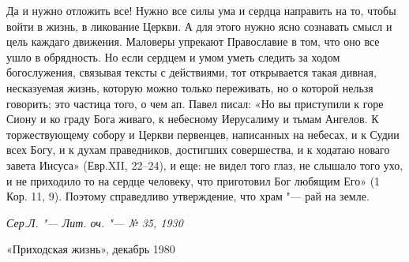 \begin{mymulticols}
Да и нужно отложить все! Нужно все силы ума и сердца направить на то, чтобы войти в жизнь, в ликование Церкви. А для этого нужно ясно сознавать смысл и цель каждаго движения. Маловеры упрекают Православие в том, что оно все ушло в обрядность. Но если сердцем и умом уметь следить за ходом богослужения, связывая тексты с действиями, тот открывается такая дивная, несказуемая жизнь, которую можно только переживать, но о которой нельзя говорить; это частица того, о чем ап. Павел писал: «Но вы приступили к горе Сиону и ко граду Бога живаго, к небесному Иерусалиму и тьмам Ангелов. К торжествующему собору и Церкви первенцев, написанных на небесах, и к Судии всех Богу, и к духам праведников, достигших совершества, и к ходатаю новаго завета Иисуса» (Евр.XII, 22--24), и еще: не видел того глаз, не слышало того ухо, и не приходило то на сердце человеку, что приготовил Бог любящим Его» (1 Кор. 11, 9). Поэтому справедливо утверждение, что храм "--- рай на земле.

\bigskip

{\itshape Сер.Л. "--- Лит. оч. "--- № 35, 1930

«Приходская жизнь», декабрь 1980}

\end{mymulticols}


\mychapterending
